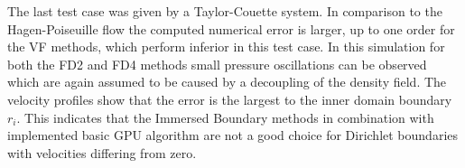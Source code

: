 The last test case was given by a Taylor-Couette system.
In comparison to the Hagen-Poiseuille flow the computed numerical error is larger,
up to one order for the VF methods, which perform inferior in this test case.
In this simulation for both the FD2 and FD4 methods small pressure oscillations can be observed which are again assumed to be
caused by a decoupling of the density field.
The velocity profiles show that the error is the largest to the inner domain boundary $r_i$.
This indicates that the Immersed Boundary methods in combination with implemented basic GPU algorithm
are not a good choice for Dirichlet boundaries with velocities differing from zero.





